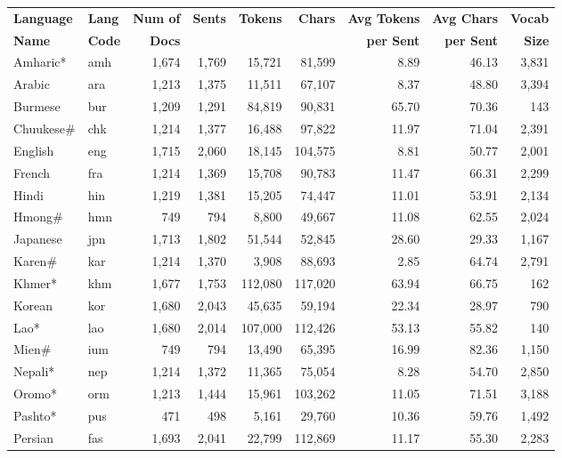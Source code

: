 \begin{table}[t]
\centering
\small
\setlength{\tabcolsep}{4pt}
\begin{tabular}{l l r r r r r r r}
\toprule
\textbf{Language} & \textbf{Lang} & \textbf{Num of} & \textbf{Sents} & \textbf{Tokens} & \textbf{Chars} & \textbf{Avg Tokens} & \textbf{Avg Chars} & \textbf{Vocab} \\
\textbf{Name} & \textbf{Code} & \textbf{Docs} &  &  &  & \textbf{per Sent} & \textbf{per Sent} & \textbf{Size} \\
\midrule
Amharic* & amh & 1,674 & 1,769 & 15,721 & 81,599 & 8.89 & 46.13 & 3,831 \\
Arabic & ara & 1,213 & 1,375 & 11,511 & 67,107 & 8.37 & 48.80 & 3,394 \\
Burmese & bur & 1,209 & 1,291 & 84,819 & 90,831 & 65.70 & 70.36 & 143 \\
Chuukese\# & chk & 1,214 & 1,377 & 16,488 & 97,822 & 11.97 & 71.04 & 2,391 \\
English & eng & 1,715 & 2,060 & 18,145 & 104,575 & 8.81 & 50.77 & 2,001 \\
French & fra & 1,214 & 1,369 & 15,708 & 90,783 & 11.47 & 66.31 & 2,299 \\
Hindi & hin & 1,219 & 1,381 & 15,205 & 74,447 & 11.01 & 53.91 & 2,134 \\
Hmong\# & hmn & 749 & 794 & 8,800 & 49,667 & 11.08 & 62.55 & 2,024 \\
Japanese & jpn & 1,713 & 1,802 & 51,544 & 52,845 & 28.60 & 29.33 & 1,167 \\
Karen\# & kar & 1,214 & 1,370 & 3,908 & 88,693 & 2.85 & 64.74 & 2,791 \\
Khmer* & khm & 1,677 & 1,753 & 112,080 & 117,020 & 63.94 & 66.75 & 162 \\
Korean & kor & 1,680 & 2,043 & 45,635 & 59,194 & 22.34 & 28.97 & 790 \\
Lao* & lao & 1,680 & 2,014 & 107,000 & 112,426 & 53.13 & 55.82 & 140 \\
Mien\# & ium & 749 & 794 & 13,490 & 65,395 & 16.99 & 82.36 & 1,150 \\
Nepali* & nep & 1,214 & 1,372 & 11,365 & 75,054 & 8.28 & 54.70 & 2,850 \\
Oromo* & orm & 1,213 & 1,444 & 15,961 & 103,262 & 11.05 & 71.51 & 3,188 \\
Pashto* & pus & 471 & 498 & 5,161 & 29,760 & 10.36 & 59.76 & 1,492 \\
Persian & fas & 1,693 & 2,041 & 22,799 & 112,869 & 11.17 & 55.30 & 2,283 \\

\end{tabular}
\end{table}
